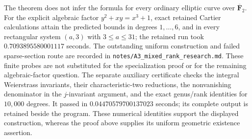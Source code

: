 \begin{remark}
\label{rem:DE-A3-mixed-fixed-refinement}
The theorem does not infer the formula for every ordinary elliptic
curve over $\overline{\mathbf F}_2$.  For the explicit algebraic
factor $y^2+xy=x^3+1$, exact retained Cartier calculations attain
the predicted bounds in degrees $1,\ldots,6$, and in every
rectangular system $(a,3)$ with $3\le a\le31$; the retained run
took $0.7093895580001117$ seconds.  The outstanding uniform
construction and failed sparse-section route are recorded in
\texttt{notes/A3\_mixed\_rank\_research.md}.  These finite probes
are not substituted for the specialization proof or for the
remaining algebraic-factor question.
The separate auxiliary certificate
checks the integral Weierstrass invariants, their characteristic-two
reductions, the nonvanishing denominator in the $j$-invariant argument,
and the exact genus/rank identities for $10{,}000$ degrees.  It passed
in $0.04470579700137023$ seconds; its complete output is retained
beside the program.  These numerical identities support the displayed
construction, whereas the proof above supplies its uniform geometric
existence assertion.
\end{remark}
